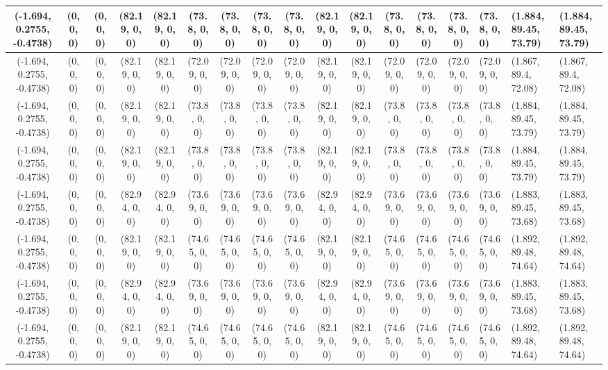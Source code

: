 \begin{tabular}{| c | c | c | c | c | c | c | c | c | c | c | c | c | c |}
	(-1.694, 0.2755, -0.4738) & (0, 0, 0) & (0, 0, 0) & (82.19, 0, 0) & (82.19, 0, 0) & (73.8, 0, 0) & (73.8, 0, 0) & (73.8, 0, 0) & (73.8, 0, 0) & (82.19, 0, 0) & (82.19, 0, 0) & (73.8, 0, 0) & (73.8, 0, 0) & (73.8, 0, 0) & (73.8, 0, 0) & (1.884, 89.45, 73.79) & (1.884, 89.45, 73.79) \\ \hline
	(-1.694, 0.2755, -0.4738) & (0, 0, 0) & (0, 0, 0) & (82.19, 0, 0) & (82.19, 0, 0) & (72.09, 0, 0) & (72.09, 0, 0) & (72.09, 0, 0) & (72.09, 0, 0) & (82.19, 0, 0) & (82.19, 0, 0) & (72.09, 0, 0) & (72.09, 0, 0) & (72.09, 0, 0) & (72.09, 0, 0) & (1.867, 89.4, 72.08) & (1.867, 89.4, 72.08) \\ \hline
	(-1.694, 0.2755, -0.4738) & (0, 0, 0) & (0, 0, 0) & (82.19, 0, 0) & (82.19, 0, 0) & (73.8, 0, 0) & (73.8, 0, 0) & (73.8, 0, 0) & (73.8, 0, 0) & (82.19, 0, 0) & (82.19, 0, 0) & (73.8, 0, 0) & (73.8, 0, 0) & (73.8, 0, 0) & (73.8, 0, 0) & (1.884, 89.45, 73.79) & (1.884, 89.45, 73.79) \\ \hline
	(-1.694, 0.2755, -0.4738) & (0, 0, 0) & (0, 0, 0) & (82.19, 0, 0) & (82.19, 0, 0) & (73.8, 0, 0) & (73.8, 0, 0) & (73.8, 0, 0) & (73.8, 0, 0) & (82.19, 0, 0) & (82.19, 0, 0) & (73.8, 0, 0) & (73.8, 0, 0) & (73.8, 0, 0) & (73.8, 0, 0) & (1.884, 89.45, 73.79) & (1.884, 89.45, 73.79) \\ \hline
	(-1.694, 0.2755, -0.4738) & (0, 0, 0) & (0, 0, 0) & (82.94, 0, 0) & (82.94, 0, 0) & (73.69, 0, 0) & (73.69, 0, 0) & (73.69, 0, 0) & (73.69, 0, 0) & (82.94, 0, 0) & (82.94, 0, 0) & (73.69, 0, 0) & (73.69, 0, 0) & (73.69, 0, 0) & (73.69, 0, 0) & (1.883, 89.45, 73.68) & (1.883, 89.45, 73.68) \\ \hline
	(-1.694, 0.2755, -0.4738) & (0, 0, 0) & (0, 0, 0) & (82.19, 0, 0) & (82.19, 0, 0) & (74.65, 0, 0) & (74.65, 0, 0) & (74.65, 0, 0) & (74.65, 0, 0) & (82.19, 0, 0) & (82.19, 0, 0) & (74.65, 0, 0) & (74.65, 0, 0) & (74.65, 0, 0) & (74.65, 0, 0) & (1.892, 89.48, 74.64) & (1.892, 89.48, 74.64) \\ \hline
	(-1.694, 0.2755, -0.4738) & (0, 0, 0) & (0, 0, 0) & (82.94, 0, 0) & (82.94, 0, 0) & (73.69, 0, 0) & (73.69, 0, 0) & (73.69, 0, 0) & (73.69, 0, 0) & (82.94, 0, 0) & (82.94, 0, 0) & (73.69, 0, 0) & (73.69, 0, 0) & (73.69, 0, 0) & (73.69, 0, 0) & (1.883, 89.45, 73.68) & (1.883, 89.45, 73.68) \\ \hline
	(-1.694, 0.2755, -0.4738) & (0, 0, 0) & (0, 0, 0) & (82.19, 0, 0) & (82.19, 0, 0) & (74.65, 0, 0) & (74.65, 0, 0) & (74.65, 0, 0) & (74.65, 0, 0) & (82.19, 0, 0) & (82.19, 0, 0) & (74.65, 0, 0) & (74.65, 0, 0) & (74.65, 0, 0) & (74.65, 0, 0) & (1.892, 89.48, 74.64) & (1.892, 89.48, 74.64) \\ \hline

\end{tabular}

